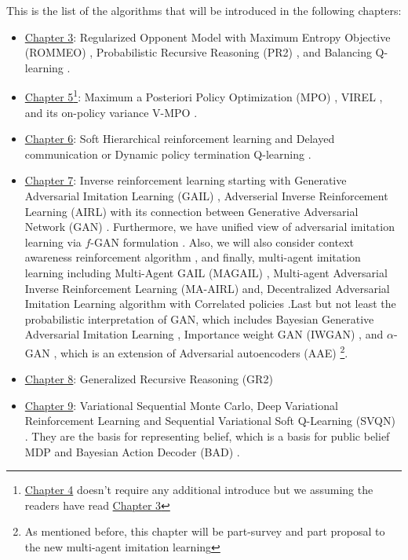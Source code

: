 \label{sec:chap2-other-algos}
This is the list of the algorithms that will be introduced in the following chapters: 
\begin{itemize}
    \item \hyperref[chapter:chap3]{Chapter 3}: Regularized Opponent Model with Maximum Entropy Objective (ROMMEO) \cite{tian2019regularized}, Probabilistic Recursive Reasoning (PR2) \cite{wen2019probabilistic}, and Balancing Q-learning \cite{grau2018balancing}.
    \item \hyperref[chapter:chap5]{Chapter 5}\footnote{\hyperref[chapter:chap4]{Chapter 4} doesn't require any additional introduce but we assuming the readers have read \hyperref[chapter:chap3]{Chapter 3}}:  Maximum a Posteriori Policy Optimization (MPO) \cite{abdolmaleki2018maximum}, VIREL \cite{fellows2019virel}, and its on-policy variance V-MPO \cite{song2019v}. 
    \item \hyperref[chapter:chap6]{Chapter 6}: Soft Hierarchical reinforcement learning \cite{igl2019multitask, lobo2019soft} and Delayed communication or Dynamic policy termination Q-learning \cite{han2019multi}.
    \item \hyperref[chapter:chap7]{Chapter 7}: Inverse reinforcement learning starting with Generative Adversarial Imitation Learning (GAIL) \cite{ho2016generative}, Adverserial Inverse Reinforcement Learning (AIRL) \cite{fu2017learning} with its connection between Generative Adversarial Network (GAN) \cite{goodfellow2014generative, finn2016connection}. Furthermore, we have unified view of adversarial imitation learning via $f$-GAN \cite{nowozin2016f} formulation \cite{ghasemipour2019divergence, ke2019imitation}. Also, we will also consider context awareness reinforcement algorithm \cite{yu2019meta, rakelly2019efficient}, and finally, multi-agent imitation learning including Multi-Agent GAIL (MAGAIL) \cite{song2018multi}, Multi-agent Adversarial Inverse Reinforcement Learning (MA-AIRL) \cite{yu2019multi} and, Decentralized Adversarial Imitation Learning algorithm with Correlated policies \cite{liu2020multi}.Last but not least the probabilistic interpretation of GAN, which includes Bayesian Generative Adversarial Imitation Learning \cite{jeon2018bayesian}, Importance weight GAN (IWGAN) \cite{hu2017unifying}, and $\alpha$-GAN \cite{rosca2017variational}, which is an extension of Adversarial autoencoders (AAE) \cite{makhzani2015adversarial}\footnote{As mentioned before, this chapter will be part-survey and part proposal to the new multi-agent imitation learning}.
    \item \hyperref[chapter:chap8]{Chapter 8}: Generalized Recursive Reasoning (GR2) \cite{wen2019multi}
    \item \hyperref[chapter:chap9]{Chapter 9}: Variational Sequential Monte Carlo, Deep Variational Reinforcement Learning \cite{igl2018deep, shvechikovjoint} and Sequential Variational Soft Q-Learning (SVQN) \cite{huangsvqn}. They are the basis for representing belief, which is a basis for public belief MDP \cite{nayyar2013decentralized} and Bayesian Action Decoder (BAD) \cite{foerster2018bayesian}. 
\end{itemize}
